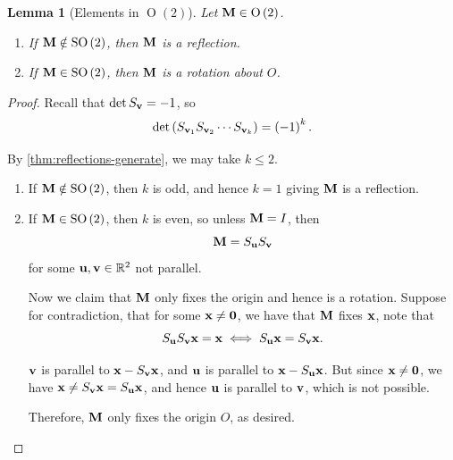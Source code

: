 \documentclass{article}
\newtheorem{lemma}[theorem]{Lemma}
\theoremstyle{definition}
\theoremstyle{remark}
\newcommand{\pqty}[1]{\left(#1\right)}
\newcommand{\RR}{\mathbb{R}}
\newcommand{\identityM}{I}
\newcommand{\SO}{\operatorname{SO}}
\newcommand{\Or}{\operatorname{O}}
\begin{document}
\begin{lemma}[Elements in \(\Or\pqty{2}\)]
    \label{lem:elements-in-o2}%
    Let \(\vb{M} \in \Or\pqty{2}\).
    \begin{enumerate}
        \item If \(\vb{M} \notin \SO\pqty{2}\), then \(\vb{M}\) is a reflection.
        \item If \(\vb{M} \in \SO\pqty{2}\), then \(\vb{M}\) is a rotation about \(O\).
    \end{enumerate}
\end{lemma}

\begin{proof}
    Recall that \(\det S_{\vb{v}} = -1\), so
    \[
        \det \pqty{S_{\vb{v}_1} S_{\vb{v}_2} \cdots S_{\vb{v}_k}} = \pqty{-1}^k.
    \]

    By \autoref{thm:reflections-generate}, we may take \(k \leq 2\).
    \begin{enumerate}
        \item If \(\vb{M} \notin \SO\pqty{2}\), then \(k\) is odd, and hence \(k = 1\) giving \(\vb{M}\) is a reflection.
        \item If \(\vb{M} \in \SO\pqty{2}\), then \(k\) is even, so unless \(\vb{M} = \identityM\), then 
        \[
            \vb{M} = S_{\vb{u}} S_{\vb{v}}
        \]
        for some \(\vb{u}, \vb{v} \in \RR^2\) not parallel.

        Now we claim that \(\vb{M}\) only fixes the origin and hence is a rotation. Suppose for contradiction, that for some \(\vb{x} \neq \vb{0}\), we have that \(\vb{M}\) fixes \(\vb{x}\), note that
        \[
            S_{\vb{u}} S_{\vb{v}} \vb{x} = \vb{x} \iff S_{\vb{u}} \vb{x} = S_{\vb{v}} \vb{x}.
        \]

        \(\vb{v}\) is parallel to \(\vb{x} - S_{\vb{v}} \vb{x}\), and \(\vb{u}\) is parallel to \(\vb{x} - S_{\vb{u}} \vb{x}\). But since \(\vb{x} \neq \vb{0}\), we have \(\vb{x} \neq S_{\vb{v}} \vb{x} = S_{\vb{u}} \vb{x}\), and hence \(\vb{u}\) is parallel to \(\vb{v}\), which is not possible.

        Therefore, \(\vb{M}\) only fixes the origin \(O\), as desired.
    \end{enumerate}
\end{proof}
\end{document}
